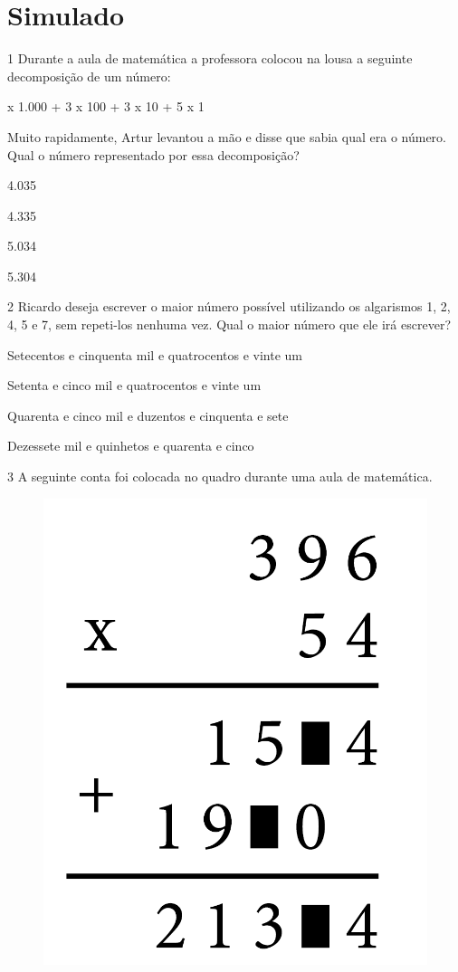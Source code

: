 \setcounter{chapter}{0}
\chapter[Simulado 3]{Simulado}

\num{1} Durante a aula de matemática a professora colocou na lousa a
seguinte decomposição de um número:

\begin{mdframed}[linewidth=2pt,linecolor=salmao,backgroundcolor=salmao!20]
 x 1.000 + 3 x 100 + 3 x 10 + 5 x 1
\end{mdframed}

Muito rapidamente, Artur levantou a mão e disse que sabia qual era o
número. Qual o número representado por essa decomposição?

\begin{minipage}{.5\textwidth}
\begin{escolha}
\item
  4.035
\item
  4.335
\item
  5.034
\item
  5.304
\end{escolha}
\end{minipage}


\num{2} Ricardo deseja escrever o maior número possível
utilizando os algarismos 1, 2, 4, 5 e 7, sem repeti-los nenhuma vez. Qual
o maior número que ele irá escrever?

\begin{escolha}
\item
  Setecentos e cinquenta mil e quatrocentos e vinte um
\item
  Setenta e cinco mil e quatrocentos e vinte um
\item
  Quarenta e cinco mil e duzentos e cinquenta e sete
\item
  Dezessete mil e quinhetos e quarenta e cinco
\end{escolha}


\pagebreak
\num{3} A seguinte conta foi colocada no quadro durante uma aula de
matemática.

\begin{figure}[htpb!]
\centering
\includegraphics[width=.2\textwidth]{../ilustracoes/MAT5/SAEB_5ANO_MAT_figura121.png}
\end{figure}

